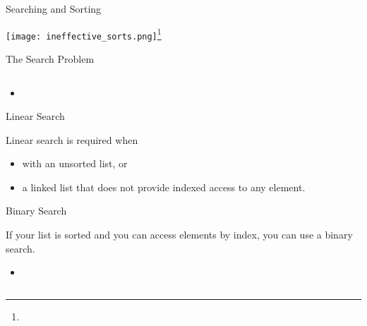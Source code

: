 \documentclass{beamer}
\author[Chris Simpkins] 
{Christopher Simpkins \\\texttt{chris.simpkins@gatech.edu}}
\institute[Georgia Tech] %
\date[CS 1331]{}
\begin{document}
\begin{frame}{Searching and Sorting}
\vspace{-.1in}
  \begin{center} \texttt{[image: ineffective\_sorts.png]}\footnote{}
  \end{center}
\end{frame}



\begin{frame}[fragile]{The Search Problem}


\begin{lstlisting}[language=Java]

\end{lstlisting}

\begin{itemize}
\item
\end{itemize}


\end{frame}


\begin{frame}[fragile]{Linear Search}


Linear search is required when
\begin{itemize}
\item with an unsorted list, or
\item a linked list that does not provide indexed access to any element.
\end{itemize}


\end{frame}


\begin{frame}[fragile]{Binary Search}


If your list is sorted and you can access elements by index, you can use a binary search.
\begin{itemize}
\item
\end{itemize}

\begin{lstlisting}[language=Java]

\end{lstlisting}


\end{frame}
\end{document}

